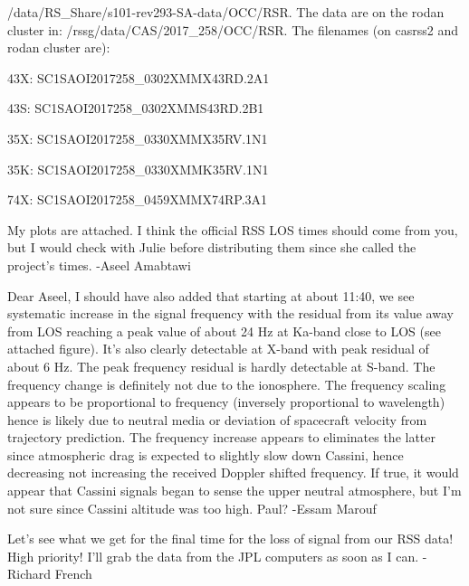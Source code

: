 \documentclass[crop=false,class=book]{standalone}
\begin{document}
/data/RS\_Share/s101-rev293-SA-data/OCC/RSR. The data are on the rodan cluster in: /rssg/data/CAS/2017\_258/OCC/RSR. The filenames (on casrss2 and rodan cluster are):
\begin{itemize}
\begin{multicols}{2}
    \item 43X: SC1SAOI2017258\_0302XMMX43RD.2A1
    \item 43S: SC1SAOI2017258\_0302XMMS43RD.2B1
    \item 35X: SC1SAOI2017258\_0330XMMX35RV.1N1
    \item 35K: SC1SAOI2017258\_0330XMMK35RV.1N1
    \item 74X: SC1SAOI2017258\_0459XMMX74RP.3A1
\end{multicols}
\end{itemize}
My plots are attached. I think the official RSS LOS times should come from you, but I would check with Julie before distributing them since she called the project's times. -Aseel Amabtawi\par
Dear Aseel, I should have also added that starting at about 11:40, we see systematic increase in the signal frequency with the residual from its value away from LOS reaching a peak value of about 24 Hz at Ka-band close to LOS (see attached figure).  It’s also clearly detectable at X-band with peak residual of about 6 Hz. The peak frequency residual is hardly detectable at S-band. The frequency change is definitely not due to the ionosphere. The frequency scaling appears to be proportional to frequency (inversely proportional to wavelength) hence is likely due to neutral media or deviation of spacecraft velocity from trajectory prediction.  The frequency increase appears to eliminates the latter since atmospheric drag is expected to slightly slow down Cassini, hence decreasing not increasing the received Doppler shifted frequency. If true, it would appear that Cassini signals began to sense the upper neutral  atmosphere, but I’m not sure since Cassini altitude was too high.  Paul? -Essam Marouf\par
Let's see what we get for the final time for the loss of signal from our RSS data! High priority! I'll grab the data from the JPL computers as soon as I can. -Richard French
\end{document}
